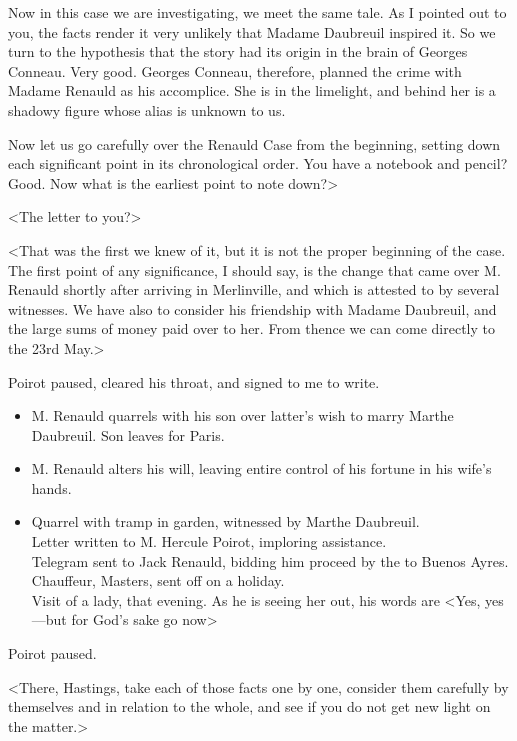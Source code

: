 Now in this case we are investigating, we meet the same tale. As I pointed out to you, the facts render it very unlikely that Madame Daubreuil inspired it. So we turn to the hypothesis that the story had its origin in the brain of Georges Conneau. Very good. Georges Conneau, therefore, planned the crime with Madame Renauld as his accomplice. She is in the limelight, and behind her is a shadowy figure whose alias is unknown to us. 

Now let us go carefully over the Renauld Case from the beginning, setting down each significant point in its chronological order. You have a notebook and pencil? Good. Now what is the earliest point to note down?> 

 <The letter to you?> 

 <That was the first we knew of it, but it is not the proper beginning of the case. The first point of any significance, I should say, is the change that came over M. Renauld shortly after arriving in Merlinville, and which is attested to by several witnesses. We have also to consider his friendship with Madame Daubreuil, and the large sums of money paid over to her. From thence we can come directly to the 23rd May.> 

 Poirot paused, cleared his throat, and signed to me to write. 

\begin{itemize}
\item[\emph{23rd May.}] M. Renauld quarrels with his son over latter's wish to marry Marthe Daubreuil. Son leaves for Paris. 

\item[\emph{24th May.}] M. Renauld alters his will, leaving entire control of his fortune in his wife's hands. 

\item[\emph{7th June.}] Quarrel with tramp in garden, witnessed by Marthe Daubreuil.\\Letter written to M. Hercule Poirot, imploring assistance.\\Telegram sent to Jack Renauld, bidding him proceed by the  to Buenos Ayres.\\Chauffeur, Masters, sent off on a holiday.\\Visit of a lady, that evening. As he is seeing her out, his words are <Yes, yes—but for God's sake go now\longdots> 
\end{itemize}

 Poirot paused. 

 <There, Hastings, take each of those facts one by one, consider them carefully by themselves and in relation to the whole, and see if you do not get new light on the matter.> 


